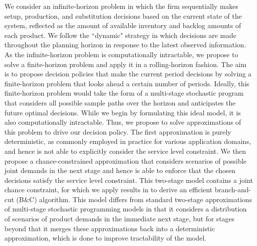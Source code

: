 \documentclass[msom]{oo}
\begin{document}
We consider an infinite-horizon problem in which the firm sequentially makes setup, production, and substitution decisions based on the current state of the system, reflected as the amount of available inventory and backlog amounts of each product. We follow the ``dynamic" strategy \citep{bookbinder1988strategies} in which decisions are made throughout the planning horizon in response to the latest observed information. As the infinite-horizon problem is computationally intractable, we propose to solve a finite-horizon problem and apply it in a rolling-horizon fashion. The aim is to propose decision policies that make the current period decisions by solving a finite-horizon problem that looks ahead a certain number of periods. 
Ideally, this finite-horizon problem would take the form of a multi-stage stochastic program that considers all possible sample paths over the horizon and anticipates the future optimal decisions. While we begin by formulating this ideal model, it is also computationally intractable.
Thus, we propose to solve approximations of this problem to drive our decision policy. The first approximation is purely deterministic, as commonly employed in practice for various application domains, and hence is not able to explicitly consider the service level constraint. We then propose a chance-constrained approximation that considers scenarios of possible joint demands in the next stage and hence is able to enforce that the chosen decisions satisfy the service level constraint. This two-stage model contains a joint chance constraint, for which we apply results in \citep{luedtke2014branch} to derive an efficient branch-and-cut (B\&C) algorithm. This model differs from standard two-stage approximations of multi-stage stochastic programming models in that it considers a distribution of scenarios of product demands in the immediate next stage, but for stages beyond that it merges these approximations back into a deterministic approximation, which is done to improve tractability of the model. 
\end{document}
